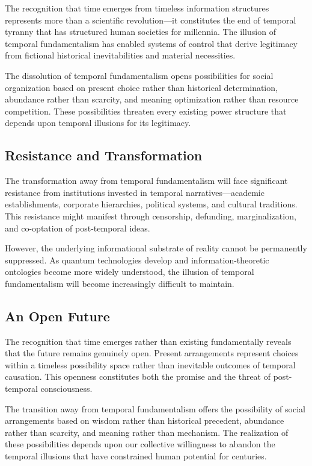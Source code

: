 \documentclass[12pt]{article}
\begin{document}
The recognition that time emerges from timeless information structures represents more than a scientific revolution—it constitutes the end of temporal tyranny that has structured human societies for millennia. The illusion of temporal fundamentalism has enabled systems of control that derive legitimacy from fictional historical inevitabilities and material necessities.

The dissolution of temporal fundamentalism opens possibilities for social organization based on present choice rather than historical determination, abundance rather than scarcity, and meaning optimization rather than resource competition. These possibilities threaten every existing power structure that depends upon temporal illusions for its legitimacy.

\subsection{Resistance and Transformation}

The transformation away from temporal fundamentalism will face significant resistance from institutions invested in temporal narratives—academic establishments, corporate hierarchies, political systems, and cultural traditions. This resistance might manifest through censorship, defunding, marginalization, and co-optation of post-temporal ideas.

However, the underlying informational substrate of reality cannot be permanently suppressed. As quantum technologies develop and information-theoretic ontologies become more widely understood, the illusion of temporal fundamentalism will become increasingly difficult to maintain.

\subsection{An Open Future}

The recognition that time emerges rather than existing fundamentally reveals that the future remains genuinely open. Present arrangements represent choices within a timeless possibility space rather than inevitable outcomes of temporal causation. This openness constitutes both the promise and the threat of post-temporal consciousness.

The transition away from temporal fundamentalism offers the possibility of social arrangements based on wisdom rather than historical precedent, abundance rather than scarcity, and meaning rather than mechanism. The realization of these possibilities depends upon our collective willingness to abandon the temporal illusions that have constrained human potential for centuries.
\end{document}

